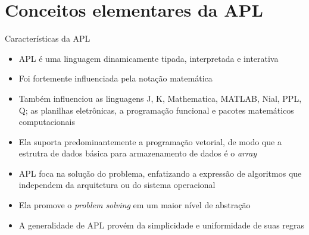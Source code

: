 \section{Conceitos elementares da APL}

\begin{frame}[fragile]{Características da APL}

    \begin{itemize}
        \item APL é uma linguagem dinamicamente tipada, interpretada e interativa
        \pause

        \item Foi fortemente influenciada pela notação matemática
        \pause

        \item Também  influenciou as linguagens J, K, Mathematica, MATLAB, Nial, PPL, Q; as planilhas eletrônicas, a programação funcional e pacotes matemáticos computacionais
        \pause

        \item Ela suporta predominantemente a programação vetorial, de modo que a estrutra de dados básica para armazenamento de dados é o \textit{array}
        \pause

        \item APL foca na solução do problema, enfatizando a expressão de algoritmos que independem da arquitetura ou do sistema operacional
        \pause

        \item Ela promove o \textit{problem solving} em um maior nível de abstração
        \pause

        \item A generalidade de APL provém da simplicidade e uniformidade de suas regras
    \end{itemize}

\end{frame}

